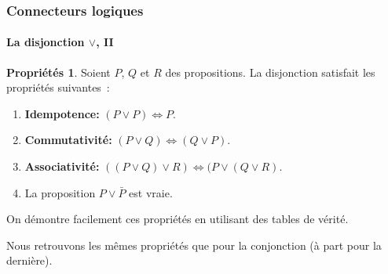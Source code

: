 \documentclass[10pt,notheorems]{beamer}
\theoremstyle{plain}
\theoremstyle{definition} %
\newtheorem{properties}{Propriétés}
\begin{document}
  \begin{frame}
    \frametitle{Connecteurs logiques}
    \framesubtitle{La disjonction $\lor$, II}
    \hypertarget{slide_disjonction_2}{}

    \begin{properties}\label{properties:disjonction}
    Soient $P$, $Q$ et $R$ des propositions. La disjonction satisfait
    les propriétés suivantes~:
    \begin{enumerate}
    \item \textbf{Idempotence:} $(P \lor P) \Leftrightarrow P$.
    \item \textbf{Commutativité:}
      $(P \lor Q) \Leftrightarrow (Q \lor P)$.
    \item \textbf{Associativité:}
      $((P \lor Q)\lor R) \Leftrightarrow (P \lor (Q\lor R)$.
    \item La proposition $P \lor \bar P$
      est vraie.
    \end{enumerate}
  \end{properties}

  \bigskip

  On démontre facilement ces propriétés en utilisant des tables de
  vérité.\newline

  Nous retrouvons les mêmes propriétés que pour la conjonction (à part pour la dernière).

  \end{frame}
\end{document}
